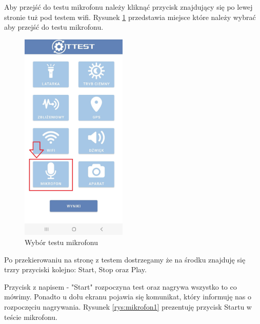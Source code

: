 \hspace{0.60cm}Aby przejść do testu mikrofonu należy kliknąć przycisk znajdujący się po lewej stronie tuż pod testem wifi. Rysunek \ref{rys:menu6} przedstawia miejsce które należy wybrać aby przejść do testu mikrofonu.

\begin{figure}[!hbt]
	\begin{center}
		\includegraphics[angle=360, width=0.45\textwidth]{rys/punkt6/menu6}
		\caption{Wybór testu mikrofonu}
		\label{rys:menu6}
	\end{center}
\end{figure}

Po przekierowaniu na stronę z testem dostrzegamy że na środku znajduję się trzry przyciski kolejno: Start, Stop oraz Play. 

\newpage


Przycisk z napisem - "Start" rozpoczyna test oraz nagrywa wszystko to co mówimy. Ponadto u dołu ekranu pojawia się komunikat, który informuję nas o rozpoczęciu nagrywania. Rysunek \ref{rys:mikrofon1} prezentuję przycisk Startu w teście mikrofonu.

